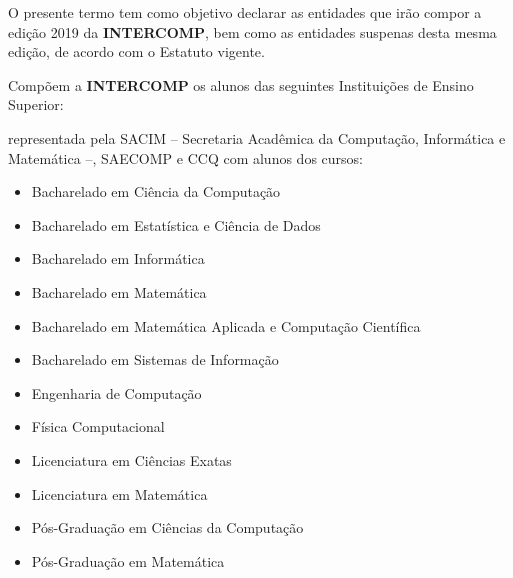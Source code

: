 
\begin{article}
	\label{art:introducao}
	O presente termo tem como objetivo declarar as entidades que irão compor a edição 2019 da \textbf{INTERCOMP}, bem como as entidades suspenas desta mesma edição, de acordo com o Estatuto vigente.
\end{article}

\begin{article}
	\label{art:integrantes}
	Compõem a \textbf{INTERCOMP} os alunos das seguintes Instituições de Ensino Superior:
	\begin{description}[noitemsep]
		\item[USP - São Carlos] representada pela SACIM -- Secretaria Acadêmica da Computação, Informática e Matemática --, SAECOMP e CCQ com alunos dos cursos:
		\begin{itemize}[noitemsep]
			\item Bacharelado em Ciência da Computação
			\item Bacharelado em Estatística e Ciência de Dados
			\item Bacharelado em Informática
			\item Bacharelado em Matemática
			\item Bacharelado em Matemática Aplicada e Computação Científica
			\item Bacharelado em Sistemas de Informação
			\item Engenharia de Computação
			\item Física Computacional
			\item Licenciatura em Ciências Exatas
			\item Licenciatura em Matemática
			\item Pós-Graduação em Ciências da Computação
			\item Pós-Graduação em Matemática
		\end{itemize}


\end{description}
\end{article}
